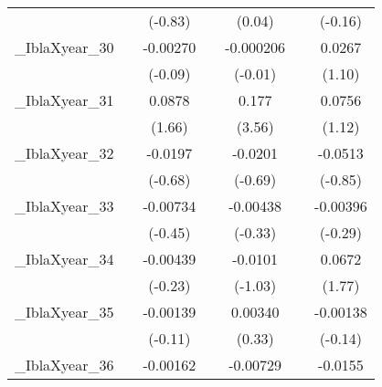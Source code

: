 {\begin{tabular}{l*{6}{c}}
            &                     &     (-0.83)         &                     &      (0.04)         &                     &     (-0.16)         \\
[1em]
\_IblaXyear\_30&                     &    -0.00270         &                     &   -0.000206         &                     &      0.0267         \\
            &                     &     (-0.09)         &                     &     (-0.01)         &                     &      (1.10)         \\
[1em]
\_IblaXyear\_31&                     &      0.0878         &                     &       0.177\sym{**} &                     &      0.0756         \\
            &                     &      (1.66)         &                     &      (3.56)         &                     &      (1.12)         \\
[1em]
\_IblaXyear\_32&                     &     -0.0197         &                     &     -0.0201         &                     &     -0.0513         \\
            &                     &     (-0.68)         &                     &     (-0.69)         &                     &     (-0.85)         \\
[1em]
\_IblaXyear\_33&                     &    -0.00734         &                     &    -0.00438         &                     &    -0.00396         \\
            &                     &     (-0.45)         &                     &     (-0.33)         &                     &     (-0.29)         \\
[1em]
\_IblaXyear\_34&                     &    -0.00439         &                     &     -0.0101         &                     &      0.0672         \\
            &                     &     (-0.23)         &                     &     (-1.03)         &                     &      (1.77)         \\
[1em]
\_IblaXyear\_35&                     &    -0.00139         &                     &     0.00340         &                     &    -0.00138         \\
            &                     &     (-0.11)         &                     &      (0.33)         &                     &     (-0.14)         \\
[1em]
\_IblaXyear\_36&                     &    -0.00162         &                     &    -0.00729         &                     &     -0.0155         \\

\end{tabular}}
